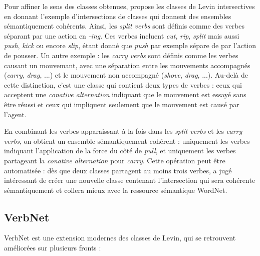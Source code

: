 Pour affiner le sens des classes obtenues, \cite{dang1998investigating} propose
les classes de Levin intersectives en donnant l'exemple d'intersections de
classes qui donnent des ensembles sémantiquement cohérents. Ainsi, les
\textit{split verbs} sont définis comme des verbes séparant par une action en
\textit{-ing}. Ces verbes incluent \textit{cut}, \textit{rip}, \textit{split}
mais aussi \textit{push}, \textit{kick} ou encore \textit{slip}, étant donné
que \textit{push} par exemple sépare de par l'action de pousser. Un autre
exemple : les \textit{carry verbs} sont définis comme les verbes causant un
mouvemant, avec une séparation entre les mouvements accompagnés
(\textit{carry}, \textit{drag}, ...) et le mouvement non accompagné
(\textit{shove}, \textit{drag}, ...). Au-delà de cette distinction, c'est une
classe qui contient deux types de verbes : ceux qui acceptent une
\textit{conative alternation} indiquant que le mouvement est essayé sans être
réussi et ceux qui impliquent seulement que le mouvement est causé par l'agent.

En combinant les verbes apparaissant à la fois dans les \textit{split verbs} et
les \textit{carry verbs}, on obtient un ensemble sémantiquement cohérent :
uniquement les verbes indiquant l'application de la force du côté de
\textit{pull}, et uniquement les verbes partageant la \textit{conative
alternation} pour \textit{carry}. Cette opération peut être automatisée : dès
que deux classes partagent au moins trois verbes, \cite{dang1998investigating}
a jugé intéressant de créer une nouvelle classe contenant l'intersection qui
sera cohérente sémantiquement et collera mieux avec la ressource sémantique
WordNet.


\subsection{VerbNet}

VerbNet est une extension modernes des classes de Levin, qui se retrouvent
améliorées sur plusieurs fronts :

